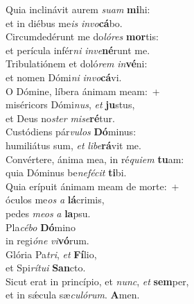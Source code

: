 \evenverse Quia inclinávit aurem \textit{su}\textit{am} \textbf{mi}hi:~\*\\
\evenverse et in diébus me\textit{is} \textit{in}\textit{vo}\textbf{cá}bo.\\
\oddverse Circumdedérunt me do\textit{ló}\textit{res} \textbf{mor}tis:~\*\\
\oddverse et perícula infér\textit{ni} \textit{in}\textit{ve}\textbf{né}runt me.\\
\evenverse Tribulatiónem et doló\textit{rem} \textit{in}\textbf{vé}ni:~\*\\
\evenverse et nomen Dómi\textit{ni} \textit{in}\textit{vo}\textbf{cá}vi.\\
\oddverse O Dómine, líbera ánimam meam:~+\\
\oddverse  miséricors Dómi\textit{nus}, \textit{et} \textbf{ju}stus,~\*\\
\oddverse et Deus no\textit{ster} \textit{mi}\textit{se}\textbf{ré}tur.\\
\evenverse Custódiens pár\textit{vu}\textit{los} \textbf{Dó}minus:~\*\\
\evenverse humiliátus sum, \textit{et} \textit{li}\textit{be}\textbf{rá}vit me.\\
\oddverse Convértere, ánima mea, in ré\textit{qui}\textit{em} \textbf{tu}am:~\*\\
\oddverse quia Dóminus be\textit{ne}\textit{fé}\textit{cit} \textbf{ti}bi.\\
\evenverse Quia erípuit ánimam meam de morte:~+\\
\evenverse  óculos me\textit{os} \textit{a} \textbf{lá}crimis,~\*\\
\evenverse pedes \textit{me}\textit{os} \textit{a} \textbf{la}psu.\\
\oddverse Pla\textit{cé}\textit{bo} \textbf{Dó}mino~\*\\
\oddverse in regi\textit{ó}\textit{ne} \textit{vi}\textbf{vó}rum.\\
\evenverse Glória Pa\textit{tri}, \textit{et} \textbf{Fí}lio,~\*\\
\evenverse et Spi\textit{rí}\textit{tu}\textit{i} \textbf{San}cto.\\
\oddverse Sicut erat in princípio, et \textit{nunc}, \textit{et} \textbf{sem}per,~\*\\
\oddverse et in sǽcula sæ\textit{cu}\textit{ló}\textit{rum}. \textbf{A}men.\\
